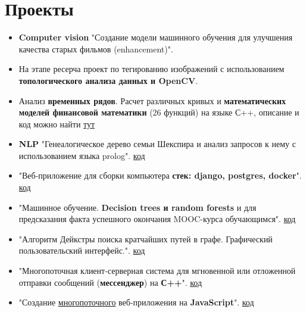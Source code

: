 \documentclass[a4paper,12pt]{article}
\begin{document}
\section{Проекты}
\begin{itemize}
    \item \textbf{Computer vision} "Создание модели машинного обучения для улучшения качества старых фильмов (enhancement)".

    \item На этапе ресерча проект по тегированию изображений с использованием \textbf{топологического анализа данных и OpenCV}.
    
    \item Анализ \textbf{временных рядов}. Расчет различных кривых и \textbf{математических моделей финансовой математики} (26 функций) на языке С++, описание и код можно найти \href{https://github.com/Suraba03/quantaton-2022-preparation}{тут}

    \item \textbf{NLP} "Генеалогическое дерево семьи Шекспира и анализ запросов к нему с использованием языка prolog". \href{https://github.com/Suraba03/LP/tree/main/cp}{код}

    \item "Веб-приложение для сборки компьютера \textbf{стек: django, postgres, docker}". \href{https://github.com/Leha-Slava-Max-Kirill/computer_workshop}{код}
    
    \item "Машинное обучение. \textbf{Decision trees и random forests} и  для предсказания факта успешного окончания MOOC-курса обучающимся". \href{https://github.com/Suraba03/mini_ML_project_sem1}{код}
    
    \item "Алгоритм Дейкстры поиска кратчайших путей в графе. Графический пользовательский интерфейс.". \href{https://github.com/Suraba03/mai_prooga_sem2/tree/main/cp_dm_Dijkstra}{код}
    
    \item "Многопоточная клиент-серверная система для мгновенной или отложенной отправки сообщений (\textbf{мессенджер}) на \textbf{С++}". \href{https://github.com/Suraba03/OS_MAI/tree/main/cp}{код}

    \item "Создание \underline{многопоточного} веб-приложения на \textbf{JavaScript}". \href{https://github.com/Leha-Slava-Max-Kirill/application}{код}

\end{itemize}
\end{document}
